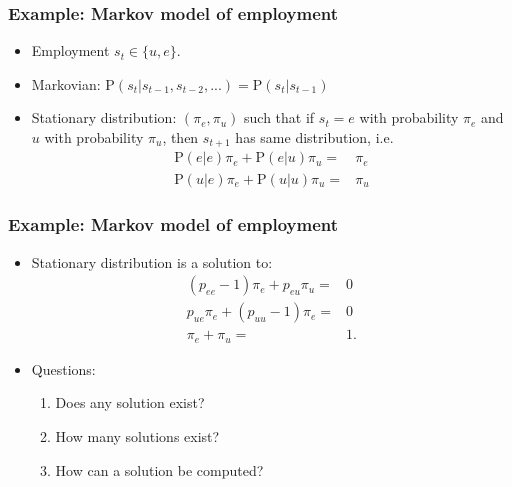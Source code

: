 \documentclass[compress]{beamer}
\def\Pr{\mathrm{P}}
\theoremstyle{definition}
\begin{document}
\begin{frame}
  \frametitle{Example: Markov model of employment}
  \begin{itemize} 
  \item Employment $s_t \in \{u, e\}$.
  \item Markovian: $\Pr(s_t | s_{t-1}, s_{t-2} , ... ) = \Pr(s_t|
    s_{t-1})$
  \item Stationary distribution: $(\pi_e, \pi_u)$ such that if $s_t = e$
    with probability $\pi_e$ and $u$ with probability $\pi_u$, then
    $s_{t+1}$ has same distribution, i.e.\ 
    \begin{align*}
       \Pr(e|e) \pi_e + \Pr(e|u) \pi_u = & \pi_e \\
       \Pr(u|e) \pi_e + \Pr(u|u) \pi_u = & \pi_u
    \end{align*}
  \end{itemize}
\end{frame}
\begin{frame}
  \frametitle{Example: Markov model of employment}
  \begin{itemize}
  \item Stationary distribution is a solution to:
  \begin{align*}
      (p_{ee}-1) \pi_e + p_{eu} \pi_u = & 0\\
      p_{ue} \pi_e + (p_{uu}-1) \pi_e= & 0\\
      \pi_e + \pi_u = & 1 .
    \end{align*}
  \item Questions:
    \begin{enumerate}
    \item Does any solution exist? 
    \item How many solutions exist?
    \item How can a solution be computed?
    \end{enumerate}    
  \end{itemize}
\end{frame}
\end{document}
